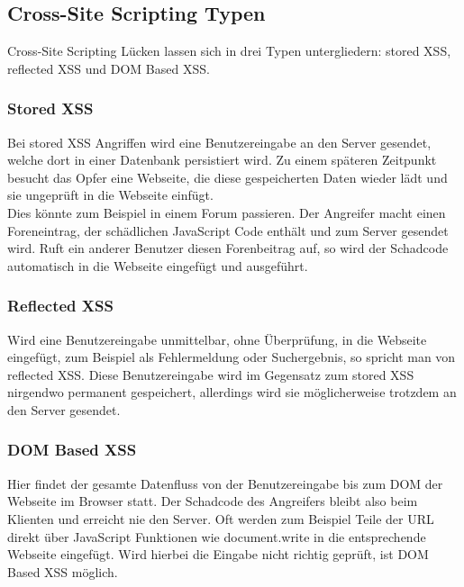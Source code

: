 \subsection{Cross-Site Scripting Typen}
Cross-Site Scripting Lücken lassen sich in drei Typen untergliedern: stored XSS, reflected XSS und DOM Based XSS. \cite{XSSTypes}
\subsubsection{Stored XSS}
Bei stored XSS Angriffen wird eine Benutzereingabe an den Server gesendet, welche dort in einer Datenbank persistiert wird. Zu einem späteren Zeitpunkt besucht das Opfer eine Webseite, die diese gespeicherten Daten wieder lädt und sie ungeprüft in die Webseite einfügt. \\
Dies könnte zum Beispiel in einem Forum passieren. Der Angreifer macht einen Foreneintrag, der schädlichen JavaScript Code enthält und zum Server gesendet wird. Ruft ein anderer Benutzer diesen Forenbeitrag auf, so wird der Schadcode automatisch in die Webseite eingefügt und ausgeführt. 
\subsubsection{Reflected XSS}
Wird eine Benutzereingabe unmittelbar, ohne Überprüfung, in die Webseite eingefügt, zum Beispiel als Fehlermeldung oder Suchergebnis, so spricht man von reflected XSS. Diese Benutzereingabe wird im Gegensatz zum stored XSS nirgendwo permanent gespeichert, allerdings wird sie möglicherweise trotzdem an den Server gesendet.
\subsubsection{DOM Based XSS}
Hier findet der gesamte Datenfluss von der Benutzereingabe bis zum DOM der Webseite im Browser statt. Der Schadcode des Angreifers bleibt also beim Klienten und erreicht nie den Server. Oft werden zum Beispiel Teile der URL direkt über JavaScript Funktionen wie document.write in die entsprechende Webseite eingefügt. Wird hierbei die Eingabe nicht richtig geprüft, ist DOM Based XSS möglich. \cite{XSSDOMBased}

